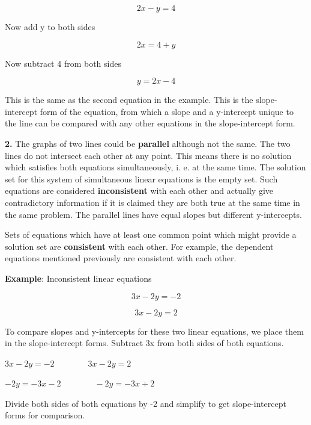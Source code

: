 $$2x -y = 4 $$



Now add y to both sides



$$2x = 4 + y $$

Now subtract 4 from both sides



$$y = 2x - 4 $$



This is the same as the second equation in the example. This is the slope-intercept form
of the equation, from which a slope and a y-intercept unique to the line can be compared
with any other equations in the slope-intercept form.



\textbf{2.} The graphs of two lines could be \textbf{parallel} although not the same. The two lines do not intersect each other at any point. This means there is no solution which satisfies both equations simultaneously, i. e. at the same time. The solution set for this system of simultaneous linear equations is the empty set. Such equations are considered \textbf{inconsistent} with each other and actually give contradictory information if it is claimed they are both true at the same time in the same problem. The parallel lines have equal slopes but different y-intercepts.



Sets of equations which have at least one common point which might provide a solution set
are \textbf{consistent} with each other. For example, the dependent equations mentioned
previously are consistent with each other.



\textbf{Example}: Inconsistent linear equations



$$3x - 2y = -2 $$



$$3x -2y = 2 $$



To compare slopes and y-intercepts for these two linear equations, we place them in the
slope-intercept forms. Subtract 3x from both sides of both equations.



$3x - 2y = -2 \qquad  \qquad  3x -2y = 2$ 



$-2y = -3x - 2 \qquad \qquad -2y = -3x + 2$



Divide both sides of both equations by -2 and simplify to get slope-intercept forms for comparison.



